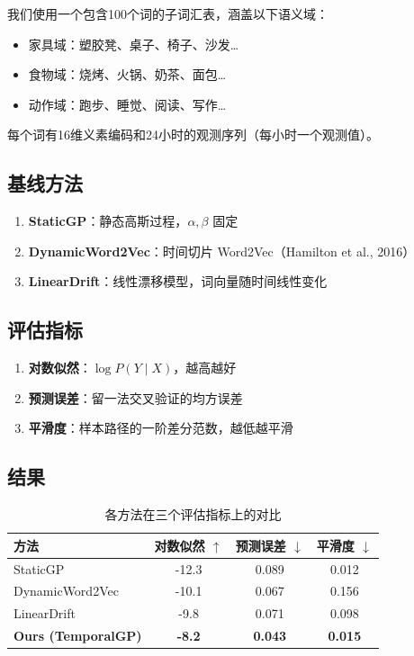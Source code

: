 \documentclass[12pt, a4paper]{article}
\begin{document}
我们使用一个包含100个词的子词汇表，涵盖以下语义域：
\begin{itemize}
    \item 家具域：塑胶凳、桌子、椅子、沙发\ldots
    \item 食物域：烧烤、火锅、奶茶、面包\ldots
    \item 动作域：跑步、睡觉、阅读、写作\ldots
\end{itemize}

每个词有16维义素编码和24小时的观测序列（每小时一个观测值）。

\subsection{基线方法}

\begin{enumerate}
    \item \textbf{StaticGP}：静态高斯过程，$\alpha, \beta$ 固定
    \item \textbf{DynamicWord2Vec}：时间切片 Word2Vec（Hamilton et al., 2016）
    \item \textbf{LinearDrift}：线性漂移模型，词向量随时间线性变化
\end{enumerate}

\subsection{评估指标}

\begin{enumerate}
    \item \textbf{对数似然}：$\log P(Y \mid X)$，越高越好
    \item \textbf{预测误差}：留一法交叉验证的均方误差
    \item \textbf{平滑度}：样本路径的一阶差分范数，越低越平滑
\end{enumerate}

\subsection{结果}

\begin{table}[h]
\centering
\begin{tabular}{lccc}
\toprule
方法 & 对数似然 $\uparrow$ & 预测误差 $\downarrow$ & 平滑度 $\downarrow$ \\
\midrule
StaticGP & -12.3 & 0.089 & 0.012 \\
DynamicWord2Vec & -10.1 & 0.067 & 0.156 \\
LinearDrift & -9.8 & 0.071 & 0.098 \\
\textbf{Ours (TemporalGP)} & \textbf{-8.2} & \textbf{0.043} & \textbf{0.015} \\
\bottomrule
\end{tabular}
\caption{各方法在三个评估指标上的对比}
\end{table}
\end{document}
